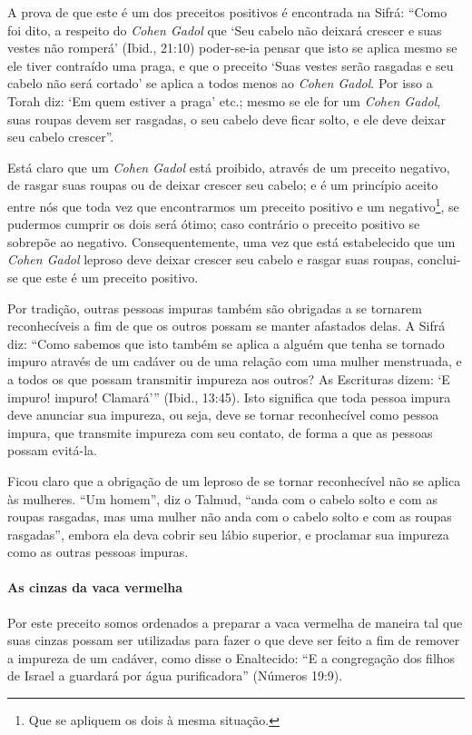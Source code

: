 A prova de que este é um dos preceitos positivos é encontrada na Sifrá:
``Como foi dito, a respeito do \textit{Cohen Gadol} que `Seu cabelo não deixará
crescer e suas vestes não romperá' (Ibid., 21:10) poder-se-ia pensar que
isto se aplica mesmo se ele tiver contraído uma praga, e que o preceito
`Suas vestes serão rasgadas e seu cabelo não será cortado' se aplica a
todos menos ao \textit{Cohen Gadol}. Por isso a Torah diz: `Em quem estiver a
praga' etc.; mesmo se ele for um \textit{Cohen Gadol}, suas roupas devem ser
rasgadas, o seu cabelo deve ficar solto, e ele deve deixar seu cabelo
crescer''.

Está claro que um \textit{Cohen Gadol} está proibido, através de um preceito negativo, de rasgar suas roupas ou de deixar crescer seu cabelo; e
é um princípio aceito entre nós que toda vez que encontrarmos um
preceito positivo e um negativo\footnote{Que se apliquem os dois à mesma situação.}, se pudermos
cumprir os dois será ótimo; caso contrário o preceito positivo se
sobrepõe ao negativo. Consequentemente, uma vez que está estabelecido
que um \textit{Cohen Gadol} leproso deve deixar crescer seu cabelo e rasgar
suas roupas, conclui-se que este é um preceito positivo.

Por tradição, outras pessoas impuras também são obrigadas a se tornarem
reconhecíveis a fim de que os outros possam se manter afastados delas. A
Sifrá diz: ``Como sabemos que isto também se aplica a alguém que tenha
se tornado impuro através de um cadáver ou de uma relação com uma
mulher menstruada, e a todos os que possam transmitir impureza aos
outros? As Escrituras dizem: `E impuro! impuro! Clamará''' (Ibid.,
13:45). Isto significa que toda pessoa impura deve anunciar sua
impureza, ou seja, deve se tornar reconhecível como pessoa impura, que
transmite impureza com seu contato, de forma a que as pessoas possam
evitá-la.

Ficou claro que a obrigação de um leproso de se tornar reconhecível não
se aplica às mulheres. ``Um homem'', diz o Talmud, ``anda com o cabelo
solto e com as roupas rasgadas, mas uma mulher não anda com o cabelo
solto e com as roupas rasgadas'', embora ela deva cobrir seu lábio
superior, e proclamar sua impureza como as outras pessoas impuras.

\paragraph{As cinzas da vaca vermelha}

Por este preceito somos ordenados a preparar a vaca vermelha de maneira
tal que suas cinzas possam ser utilizadas para fazer o que deve ser
feito a fim de remover a impureza de um cadáver, como disse o
Enaltecido: ``E a congregação dos filhos de Israel a guardará por água
purificadora'' (Números 19:9).

